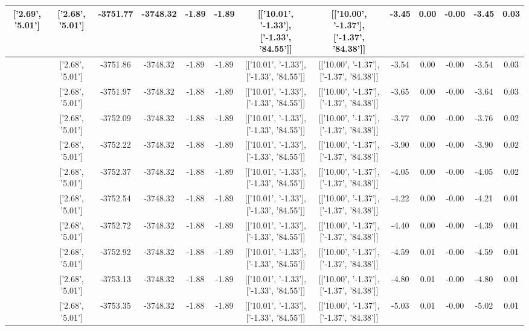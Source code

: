 \begin{table}[htbp]
\begin{adjustbox}{angle=90}
\begin{tabular}{|c|c|c|c|c|c|c|c|c|c|c|c|c|}
 ['2.69', '5.01'] & ['2.68', '5.01'] & -3751.77 & -3748.32 & -1.89 & -1.89 & [['10.01', '-1.33'], ['-1.33', '84.55']] & [['10.00', '-1.37'], ['-1.37', '84.38']] & -3.45 & 0.00 & -0.00 & -3.45 & 0.03\\ \hline
 ['2.69', '5.01'] & ['2.68', '5.01'] & -3751.86 & -3748.32 & -1.89 & -1.89 & [['10.01', '-1.33'], ['-1.33', '84.55']] & [['10.00', '-1.37'], ['-1.37', '84.38']] & -3.54 & 0.00 & -0.00 & -3.54 & 0.03\\ \hline
 ['2.69', '5.01'] & ['2.68', '5.01'] & -3751.97 & -3748.32 & -1.88 & -1.89 & [['10.01', '-1.33'], ['-1.33', '84.55']] & [['10.00', '-1.37'], ['-1.37', '84.38']] & -3.65 & 0.00 & -0.00 & -3.64 & 0.03\\ \hline
 ['2.70', '5.01'] & ['2.68', '5.01'] & -3752.09 & -3748.32 & -1.88 & -1.89 & [['10.01', '-1.33'], ['-1.33', '84.55']] & [['10.00', '-1.37'], ['-1.37', '84.38']] & -3.77 & 0.00 & -0.00 & -3.76 & 0.02\\ \hline
 ['2.70', '5.01'] & ['2.68', '5.01'] & -3752.22 & -3748.32 & -1.88 & -1.89 & [['10.01', '-1.33'], ['-1.33', '84.55']] & [['10.00', '-1.37'], ['-1.37', '84.38']] & -3.90 & 0.00 & -0.00 & -3.90 & 0.02\\ \hline
 ['2.70', '5.01'] & ['2.68', '5.01'] & -3752.37 & -3748.32 & -1.88 & -1.89 & [['10.01', '-1.33'], ['-1.33', '84.55']] & [['10.00', '-1.37'], ['-1.37', '84.38']] & -4.05 & 0.00 & -0.00 & -4.05 & 0.02\\ \hline
 ['2.70', '5.01'] & ['2.68', '5.01'] & -3752.54 & -3748.32 & -1.88 & -1.89 & [['10.01', '-1.33'], ['-1.33', '84.55']] & [['10.00', '-1.37'], ['-1.37', '84.38']] & -4.22 & 0.00 & -0.00 & -4.21 & 0.01\\ \hline
 ['2.70', '5.01'] & ['2.68', '5.01'] & -3752.72 & -3748.32 & -1.88 & -1.89 & [['10.01', '-1.33'], ['-1.33', '84.55']] & [['10.00', '-1.37'], ['-1.37', '84.38']] & -4.40 & 0.00 & -0.00 & -4.39 & 0.01\\ \hline
 ['2.70', '5.01'] & ['2.68', '5.01'] & -3752.92 & -3748.32 & -1.88 & -1.89 & [['10.01', '-1.33'], ['-1.33', '84.55']] & [['10.00', '-1.37'], ['-1.37', '84.38']] & -4.59 & 0.01 & -0.00 & -4.59 & 0.01\\ \hline
 ['2.70', '5.02'] & ['2.68', '5.01'] & -3753.13 & -3748.32 & -1.88 & -1.89 & [['10.01', '-1.33'], ['-1.33', '84.55']] & [['10.00', '-1.37'], ['-1.37', '84.38']] & -4.80 & 0.01 & -0.00 & -4.80 & 0.01\\ \hline
 ['2.70', '5.02'] & ['2.68', '5.01'] & -3753.35 & -3748.32 & -1.88 & -1.89 & [['10.01', '-1.33'], ['-1.33', '84.55']] & [['10.00', '-1.37'], ['-1.37', '84.38']] & -5.03 & 0.01 & -0.00 & -5.02 & 0.01\\ \hline

\end{tabular}
\end{adjustbox}
\end{table}
